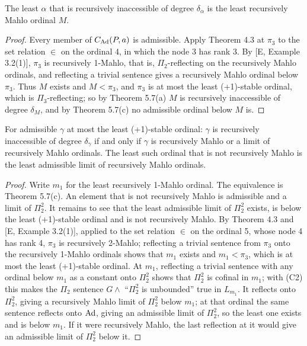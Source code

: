 \documentclass[11pt]{article}
\begin{document}
\begin{statement} The least $\alpha$ that is recursively inaccessible of degree $\delta_\alpha$ is
the least recursively Mahlo ordinal $M$.
\end{statement}

\begin{proof}
Every member of $C_{\mathrm{Ad}}(P,a)$ is admissible. Apply Theorem 4.3 at $\pi_3$ to the set relation $\in$ on the ordinal 4, in
which the node 3 has rank 3. By [E, Example 3.2(1)], $\pi_3$ is recursively 1-Mahlo, that is,
$\Pi_2$-reflecting on the recursively Mahlo ordinals, and reflecting a trivial sentence gives a recursively Mahlo
ordinal below $\pi_3$. Thus $M$ exists and $M < \pi_3$, and $\pi_3$ is at most the least (+1)-stable ordinal, which is
$\Pi_3$-reflecting; so by Theorem 5.7(a) $M$ is
recursively inaccessible of degree $\delta_M$, and by Theorem 5.7(c) no admissible ordinal below $M$ is.
\end{proof}

\begin{statement} For admissible $\gamma$ at most the least (+1)-stable ordinal: $\gamma$ is
recursively inaccessible of degree
$\delta_\gamma$ if and only if $\gamma$ is recursively Mahlo or a limit of recursively Mahlo ordinals. The least such
ordinal that is not recursively Mahlo is the least admissible limit of recursively Mahlo ordinals.
\end{statement}

\begin{proof}
Write $m_1$ for the least recursively 1-Mahlo ordinal. The equivalence is Theorem 5.7(c). An element that is not recursively Mahlo is admissible and a limit of $\Pi_2^2$. It
remains to see that the least admissible limit of $\Pi_2^2$ exists, is below the least (+1)-stable ordinal and is not recursively Mahlo. By Theorem 4.3 and [E, Example
3.2(1)], applied to the set relation $\in$ on the ordinal 5, whose node 4 has rank 4, $\pi_3$ is recursively 2-Mahlo; reflecting a
trivial sentence from $\pi_3$ onto the recursively 1-Mahlo ordinals shows that $m_1$ exists and $m_1 < \pi_3$, which is at most the least (+1)-stable ordinal. At $m_1$, reflecting a trivial
sentence with any ordinal below $m_1$ as a constant onto $\Pi_2^2$ shows that $\Pi_2^2$ is cofinal in $m_1$; with (C2) this
makes the $\Pi_2$ sentence $G \wedge$ ``$\Pi_2^2$ is unbounded'' true in $L_{m_1}$. It reflects onto $\Pi_2^2$, giving a
recursively Mahlo limit of $\Pi_2^2$ below $m_1$; at that ordinal the same sentence reflects onto $\mathrm{Ad}$, giving an
admissible limit of $\Pi_2^2$, so the least one exists and is below $m_1$. If it were recursively Mahlo, the last
reflection at it would give an admissible limit of $\Pi_2^2$ below it.
\end{proof}
\end{document}
